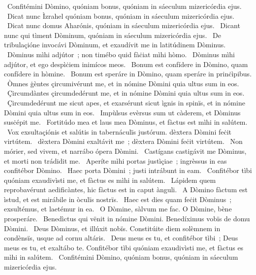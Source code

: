 \psalmChapterWithInscription{}
{ }
{%
~Confitémini Dòmino, quóniam bonus, quóniam in sáeculum mizericórdia ejus. 
~Dicat nunc Ìzrahel quóniam bonus, quóniam in sáeculum mizericórdia ejus. 
~Dicat nunc domus Aharónis, quóniam in sáeculum mizericórdia ejus. 
~Dicant nunc qui tìment Dòminum, quóniam in sáeculum mizericórdia ejus. 
~De tribulaçióne invocávi Dòminum, et exaudívit me in latitúdinem Dòminus. 
~Dòminus mìhi adjútor~; non timébo quid fàċiat mìhi hòmo. 
~Dòminus mìhi adjútor, et ego despìċiem inimícos meos. 
~Bonum est confídere in Dòmino, quam confídere in hòmine. 
~Bonum est speráre in Dòmino, quam speráre in prinċìpibus. 
~Òmnes ġèntes çircumivérunt me, et in nómine Dòmini quia ultus sum in eos. 
~Çircumdàntes çircumdedérunt me, et in nómine Dòmini quia ultus sum in eos. 
~Çircumdedérunt me sicut apes, et exarsérunt sicut ìgnis in spinïs, et in nómine Dòmini quia ultus sum in eos. 
~Impùlsus evèrsus sum ut càderem, et Dòminus susċépit me. 
~Fortitúdo mea et laus mea Dòminus, et fàctus est mìhi in salútem. 
~Vox exsultaçiónis et salútis in tabernáculïs justórum. dèxtera Dòmini feċit virtútem. 
~dèxtera Dòmini exaltávit me~; dèxtera Dòmini feċit virtútem. 
~Non mórier, sed vivem, et narrábo ópera Dòmini. 
~Castígans castigávit me Dòminus, et morti non trádidit me. 
~Aperíte mìhi portas justìçiae~; ingrèssus in eas confitébor Dòmino. 
~Haec porta Dòmini~; justi intrábunt in eam. 
~Confitébor tìbi quóniam exaudivìsti me, et fàctus es mìhi in salútem. 
~Lápidem quem reprobavérunt aedificàntes, hic fàctus est in caput ànguli. 
~A Dòmino fàctum est ìstud, et est mirábile in òculïs nostrïs. 
~Haec est dies quam feċit Dòminus~; exsultémus, et laetémur in ea. 
~O Dòmine, sàlvum me fac. O Dòmine, bène prosperáre. 
~Benedìctus qui vënit in nómine Dòmini. Benedíximus vobïs de domu Dòmini. 
~Deus Dòminus, et illúxit nobïs. Constitúite diem solèmnem in condènsïs, usque ad cornu altáris. 
~Deus meus es tu, et confitébor tìbi~; Deus meus es tu, et exaltábo te. Confitébor tìbi quóniam exaudivìsti me, et fàctus es mìhi in salútem. 
~Confitémini Dòmino, quóniam bonus, quóniam in sáeculum mizericórdia ejus. 
}
